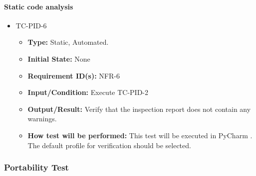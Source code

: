 \documentclass[12pt, titlepage]{article}
\begin{document}
\paragraph{Static code analysis}

\begin{itemize}
\item{TC-PID-6\\}
\begin{itemize}

\item{\textbf{Type:}} Static, Automated.
					
\item{\textbf{Initial State:}} None

\item{\textbf{Requirement ID(s):}} NFR-6
					
\item{\textbf{Input/Condition:}}  Execute TC-PID-2
					
\item{\textbf{Output/Result:}} Verify that the inspection report does not contain any warnings.

\item{\textbf{How test will be performed:}}  This test will be executed in PyCharm \cite{Pycharm}. 
The default profile for verification should be selected. 

\end{itemize}
\end{itemize}

\subsubsection{Portability Test}
\end{document}
